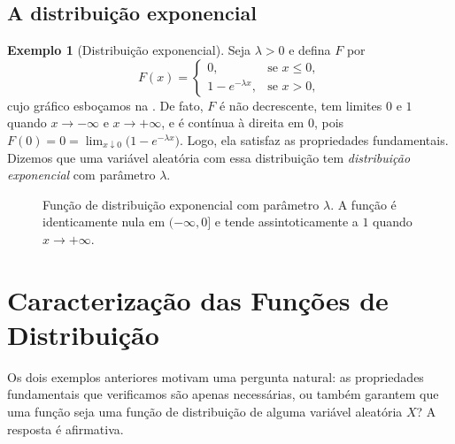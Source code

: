 \documentclass[12pt,portuguese]{article}
\theoremstyle{definition}
\newtheorem{example}[example]{Exemplo}
\theoremstyle{plainexercise}
\theoremstyle{starredexercise}
\theoremstyle{definition}
\begin{document}
\subsection{A distribuição exponencial}

\begin{example}[Distribuição exponencial]\label{ex:exponencial-fd}
  Seja $\lambda > 0$ e defina $F$ por
  \begin{equation}\label{eq:fd-exponencial}
    F(x) = \begin{cases}
      0, & \text{se } x \leqslant 0, \\[0.2cm]
      1 - e^{-\lambda x}, & \text{se } x > 0,
    \end{cases}
  \end{equation}
  cujo gráfico esboçamos na . De fato, $F$ é não
  decrescente, tem limites $0$ e $1$ quando $x\to-\infty$ e $x\to+\infty$, e é
  contínua à direita em $0$, pois
  $F(0)=0=\lim_{x\downarrow 0}\bigl(1-e^{-\lambda x}\bigr)$. Logo, ela
  satisfaz as propriedades fundamentais. Dizemos que uma variável aleatória com
  essa distribuição tem \emph{distribuição exponencial} com parâmetro
  $\lambda$.
\end{example}


\begin{figure}[H]
\centering
{}
\caption{Função de distribuição exponencial com parâmetro $\lambda$. A função é
identicamente nula em $(-\infty,0]$ e tende assintoticamente a $1$ quando
$x \to +\infty$.}
\label{fig:fd-exponencial}
\end{figure}

\section{Caracterização das Funções de Distribuição}
\label{sec:caracterizacao-fd}

Os dois exemplos anteriores motivam uma pergunta natural: as propriedades
fundamentais que verificamos são apenas necessárias, ou também garantem que
uma função seja uma função de distribuição de alguma variável aleatória $X$? 
A resposta é afirmativa.
\end{document}

